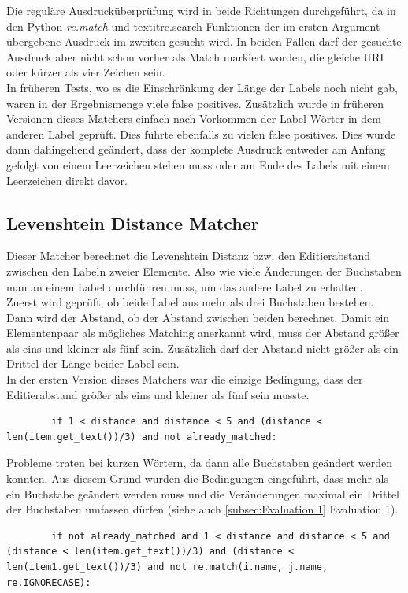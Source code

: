 		Die reguläre Ausdrucküberprüfung wird in beide Richtungen durchgeführt, da in
		den Python \textit{re.match} und textit{re.search} Funktionen der im ersten
		Argument übergebene Ausdruck im zweiten gesucht wird. In beiden Fällen darf
		der gesuchte Ausdruck aber nicht schon vorher als Match markiert worden, die
		gleiche URI oder kürzer als vier Zeichen sein.\\
		In früheren Tests, wo es die Einschränkung der Länge der Labels noch nicht
		gab, waren in der Ergebnismenge viele false positives. Zusätzlich wurde in
		früheren Versionen dieses Matchers einfach nach Vorkommen der Label Wörter in
		dem anderen Label geprüft. Dies führte ebenfalls zu vielen false positives.
		Dies wurde dann dahingehend geändert, dass der komplete Ausdruck entweder am
		Anfang gefolgt von einem Leerzeichen stehen muss oder am Ende des Labels mit
		einem Leerzeichen direkt davor.
		
		\subsection{Levenshtein Distance Matcher}
		Dieser Matcher berechnet die Levenshtein Distanz bzw. den Editierabstand
		zwischen den Labeln zweier Elemente. Also wie viele Änderungen der Buchstaben
		man an einem Label durchführen muss, um das andere Label zu erhalten.\\
		Zuerst wird geprüft, ob beide Label aus mehr als drei Buchstaben bestehen.
		Dann wird der Abstand, ob der Abstand zwischen beiden berechnet. Damit ein
		Elementenpaar als mögliches Matching anerkannt wird, muss der Abstand größer
		als eins und kleiner als fünf sein. Zusätzlich darf der Abstand nicht größer
		als ein Drittel der Länge beider Label sein.\\
		In der ersten Version dieses Matchers war die einzige Bedingung, dass der
		Editierabstand größer als eins und kleiner als fünf sein musste.
		\begin{lstlisting}
		if 1 < distance and distance < 5 and (distance < len(item.get_text())/3) and not already_matched:
		\end{lstlisting}
		Probleme traten bei kurzen Wörtern, da dann alle Buchstaben geändert werden
		konnten. Aus diesem Grund wurden die Bedingungen eingeführt, dass mehr als ein Buchstabe
		geändert werden muss und die Veränderungen maximal ein Drittel der Buchstaben
		umfassen dürfen (siehe auch \ref{subsec:Evaluation 1} Evaluation 1).
		\begin{lstlisting}
		if not already_matched and 1 < distance and distance < 5 and (distance < len(item.get_text())/3) and (distance < len(item1.get_text())/3) and not re.match(i.name, j.name, re.IGNORECASE):
		\end{lstlisting}
				
